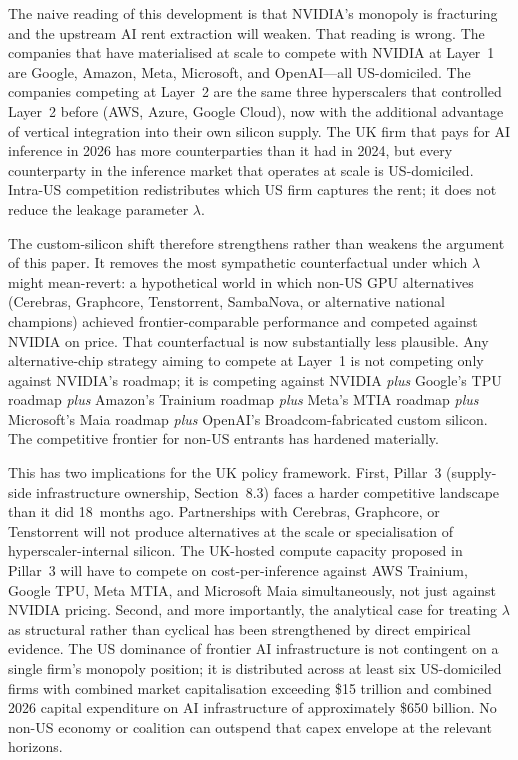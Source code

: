 \documentclass[11pt,letterpaper]{article}
\theoremstyle{remark}
\begin{document}
The naive reading of this development is that NVIDIA's monopoly is fracturing and the upstream {AI} rent extraction will weaken. That reading is wrong. The companies that have materialised at scale to compete with NVIDIA at Layer~1 are Google, Amazon, Meta, Microsoft, and OpenAI---all {US}-domiciled. The companies competing at Layer~2 are the same three hyperscalers that controlled Layer~2 before ({AWS}, Azure, Google Cloud), now with the additional advantage of vertical integration into their own silicon supply. The {UK} firm that pays for {AI} inference in 2026 has more counterparties than it had in 2024, but every counterparty in the inference market that operates at scale is {US}-domiciled. Intra-{US} competition redistributes which {US} firm captures the rent; it does not reduce the leakage parameter $\lambda$.

The custom-silicon shift therefore strengthens rather than weakens the argument of this paper. It removes the most sympathetic counterfactual under which $\lambda$ might mean-revert: a hypothetical world in which non-{US} {GPU} alternatives (Cerebras, Graphcore, Tenstorrent, {SambaNova}, or alternative national champions) achieved frontier-comparable performance and competed against NVIDIA on price. That counterfactual is now substantially less plausible. Any alternative-chip strategy aiming to compete at Layer~1 is not competing only against NVIDIA's roadmap; it is competing against NVIDIA \textit{plus} Google's {TPU} roadmap \textit{plus} Amazon's Trainium roadmap \textit{plus} Meta's {MTIA} roadmap \textit{plus} Microsoft's Maia roadmap \textit{plus} OpenAI's Broadcom-fabricated custom silicon. The competitive frontier for non-{US} entrants has hardened materially.

This has two implications for the {UK} policy framework. First, Pillar~3 (supply-side infrastructure ownership, Section~8.3) faces a harder competitive landscape than it did 18~months ago. Partnerships with Cerebras, Graphcore, or Tenstorrent will not produce alternatives at the scale or specialisation of hyperscaler-internal silicon. The {UK}-hosted compute capacity proposed in Pillar~3 will have to compete on cost-per-inference against {AWS} Trainium, Google {TPU}, Meta {MTIA}, and Microsoft Maia simultaneously, not just against NVIDIA pricing. Second, and more importantly, the analytical case for treating $\lambda$ as structural rather than cyclical has been strengthened by direct empirical evidence. The {US} dominance of frontier {AI} infrastructure is not contingent on a single firm's monopoly position; it is distributed across at least six {US}-domiciled firms with combined market capitalisation exceeding \$15 trillion and combined 2026 capital expenditure on {AI} infrastructure of approximately \$650 billion. No non-{US} economy or coalition can outspend that capex envelope at the relevant horizons.
\end{document}
